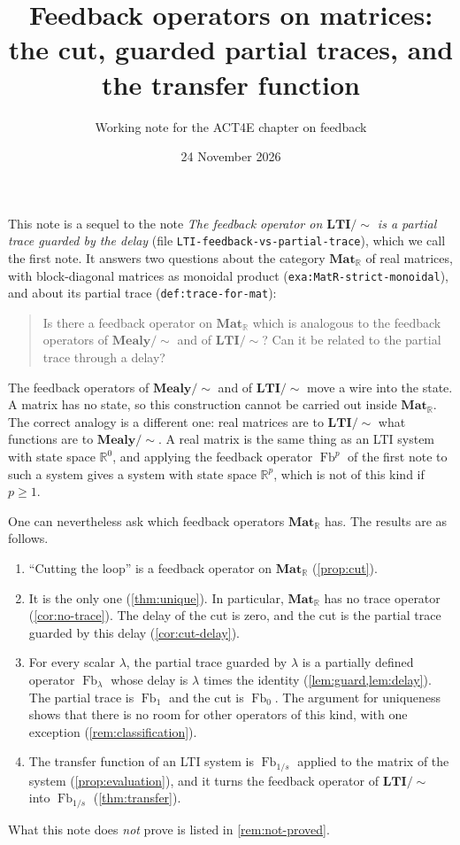 \documentclass[11pt,a4paper]{article}
\title{Feedback operators on matrices:\\ the cut, guarded partial traces, and the transfer function}
\author{Working note for the ACT4E chapter on feedback}
\date{24 November 2026}
\theoremstyle{plain}
\theoremstyle{definition}
\theoremstyle{remark}
\DeclareMathOperator{\Fb}{Fb}
\newcommand{\R}{\mathbb{R}}
\newcommand{\Mat}{\mathbf{Mat}}
\newcommand{\LTIq}{\mathbf{LTI}/{\sim}}
\newcommand{\MealyMod}{\mathbf{Mealy}/{\sim}}
\newcommand{\lbl}[1]{\nolinkurl{#1}}
\begin{document}
\maketitle

\noindent
This note is a sequel to the note \emph{The feedback operator on $\LTIq$ is a partial trace guarded by the delay} (file \lbl{LTI-feedback-vs-partial-trace}), which we call the first note.
It answers two questions about the category $\Mat_\R$ of real matrices, with block-diagonal matrices as monoidal product (\lbl{exa:MatR-strict-monoidal}), and about its partial trace (\lbl{def:trace-for-mat}):
\begin{quote}
    Is there a feedback operator on $\Mat_\R$ which is analogous to the feedback operators of $\MealyMod$ and of $\LTIq$?
    Can it be related to the partial trace through a delay?
\end{quote}

The feedback operators of $\MealyMod$ and of $\LTIq$ move a wire into the state.
A matrix has no state, so this construction cannot be carried out inside $\Mat_\R$.
The correct analogy is a different one: real matrices are to $\LTIq$ what functions are to $\MealyMod$.
A real matrix is the same thing as an LTI system with state space $\R^0$, and applying the feedback operator $\Fb^p$ of the first note to such a system gives a system with state space $\R^p$, which is not of this kind if $p \geq 1$.

One can nevertheless ask which feedback operators $\Mat_\R$ has.
The results are as follows.
\begin{enumerate}[nosep]
    \item ``Cutting the loop'' is a feedback operator on $\Mat_\R$ (\cref{prop:cut}).
    \item It is the only one (\cref{thm:unique}).
          In particular, $\Mat_\R$ has no trace operator (\cref{cor:no-trace}).
          The delay of the cut is zero, and the cut is the partial trace guarded by this delay (\cref{cor:cut-delay}).
    \item For every scalar $\lambda$, the partial trace guarded by $\lambda$ is a partially defined operator $\Fb_\lambda$ whose delay is $\lambda$ times the identity (\cref{lem:guard,lem:delay}).
          The partial trace is $\Fb_1$ and the cut is $\Fb_0$.
          The argument for uniqueness shows that there is no room for other operators of this kind, with one exception (\cref{rem:classification}).
    \item The transfer function of an LTI system is $\Fb_{1/s}$ applied to the matrix of the system (\cref{prop:evaluation}), and it turns the feedback operator of $\LTIq$ into $\Fb_{1/s}$ (\cref{thm:transfer}).
\end{enumerate}
What this note does \emph{not} prove is listed in \cref{rem:not-proved}.
\end{document}
